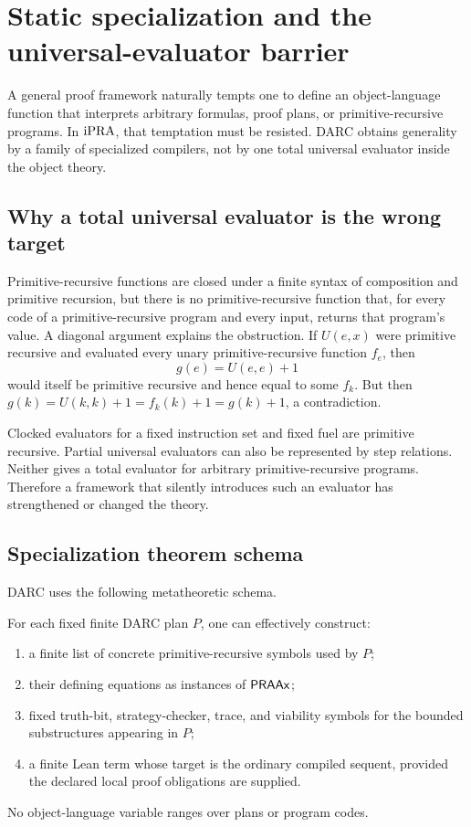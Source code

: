 \section{Static specialization and the universal-evaluator barrier}
\label{sec:specialization}

A general proof framework naturally tempts one to define an object-language
function that interprets arbitrary formulas, proof plans, or
primitive-recursive programs.  In \(\mathrm{iPRA}\), that temptation must be resisted.
DARC obtains generality by a family of specialized compilers, not by one total
universal evaluator inside the object theory.

\subsection{Why a total universal evaluator is the wrong target}

Primitive-recursive functions are closed under a finite syntax of composition
and primitive recursion, but there is no primitive-recursive function that,
for every code of a primitive-recursive program and every input, returns that
program's value.  A diagonal argument explains the obstruction.  If
\(U(e,x)\) were primitive recursive and evaluated every unary
primitive-recursive function \(f_e\), then
\[
  g(e)=U(e,e)+1
\]
would itself be primitive recursive and hence equal to some \(f_k\).  But then
\(g(k)=U(k,k)+1=f_k(k)+1=g(k)+1\), a contradiction.

Clocked evaluators for a fixed instruction set and fixed fuel are primitive
recursive.  Partial universal evaluators can also be represented by step
relations.  Neither gives a total evaluator for arbitrary primitive-recursive
programs.  Therefore a framework that silently introduces such an evaluator
has strengthened or changed the theory.

\subsection{Specialization theorem schema}

DARC uses the following metatheoretic schema.

\begin{theorem}
\label{thm:fixed-specialization}
For each fixed finite DARC plan \(P\), one can effectively construct:
\begin{enumerate}
  \item a finite list of concrete primitive-recursive symbols used by \(P\);
  \item their defining equations as instances of \(\mathsf{PRAAx}\);
  \item fixed truth-bit, strategy-checker, trace, and viability symbols for the
        bounded substructures appearing in \(P\);
  \item a finite Lean term whose target is the ordinary compiled sequent,
        provided the declared local proof obligations are supplied.
\end{enumerate}
No object-language variable ranges over plans or program codes.
\end{theorem}


